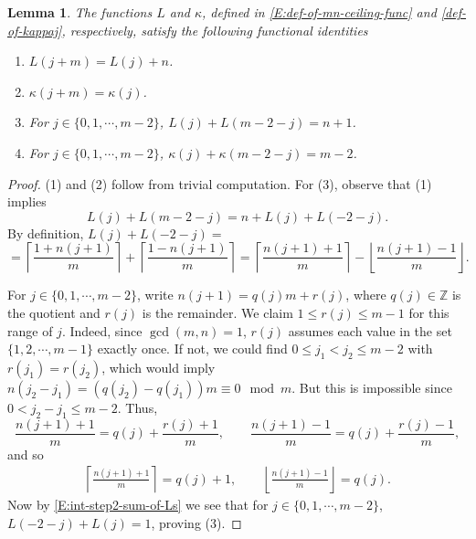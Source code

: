 \documentclass[letterpaper,11pt,reqno]{amsart}
\theoremstyle{plain}
\newtheorem{lemma}[equation]{Lemma}
\theoremstyle{definition}
\theoremstyle{remark}
\theoremstyle{remark}
\numberwithin{equation}{section}
\newcommand{\Z}{{\mathbb Z}}
\begin{document}
\begin{lemma}\label{L:props-of-L-and-kappa}
The functions $L$ and $\kappa$, defined in \eqref{E:def-of-mn-ceiling-func} and \eqref{def-of-kappaj}, respectively, satisfy the following functional identities
\begin{enumerate}
\item $L(j+m) = L(j) + n$.
\item $\kappa(j+m) = \kappa(j)$.
\item For $j \in \{0,1,\cdots,m-2 \}$, $L(j) + L(m-2-j) = n+1$.
\item For $j \in \{0,1,\cdots,m-2 \}$, $\kappa(j) + \kappa(m-2-j) = m-2$.
\end{enumerate}
\end{lemma}
\begin{proof}

(1) and (2) follow from trivial computation.
For (3), observe that (1) implies 
\[
L(j) + L(m-2-j) = n + L(j) + L(-2-j).
\]
By definition, $L(j) + L(-2-j) =$
\begin{equation}\label{E:int-step2-sum-of-Ls}
=\left\lceil \frac{1+n(j+1)}{m} \right\rceil + \left\lceil \frac{1-n(j+1)}{m} \right\rceil
= \left\lceil \frac{n(j+1)+1}{m} \right\rceil -\left\lfloor \frac{n(j+1) - 1}{m} \right\rfloor.
\end{equation}

For $j \in \{0,1,\cdots,m-2 \}$, write $n(j+1) = q(j) m + r(j)$, where $q(j) \in \Z$ is the quotient and $r(j)$ is the remainder. 
We claim $1 \le r(j) \le m-1$ for this range of $j$.
Indeed, since $\gcd(m,n) = 1$, $r(j)$ assumes each value in the set $\{1,2,\cdots,m-1 \}$ exactly once. If not, we could find $0 \le j_1 < j_2 \le m-2$ with $r(j_1) = r(j_2)$, which would imply $n(j_2-j_1) = (q(j_2)-q(j_1))m \equiv 0 \mod m$. 
But this is impossible since $0 < j_2 - j_1 \le m-2$.
Thus,
\begin{equation*}
\frac{n(j+1)+1}{m} = q(j) + \frac{r(j)+1}{m}, \qquad \frac{n(j+1)-1}{m} = q(j) + \frac{r(j)-1}{m},
\end{equation*}
and so
\begin{align*}
\left\lceil \frac{n(j+1)+1}{m} \right\rceil = q(j) + 1, \qquad \left\lfloor \frac{n(j+1)-1}{m} \right\rfloor = q(j).
\end{align*}
Now by \eqref{E:int-step2-sum-of-Ls} we see that for $j \in \{0,1,\cdots,m-2 \}$, $L(-2-j) + L(j) = 1$, proving (3).



\end{proof}
\end{document}
